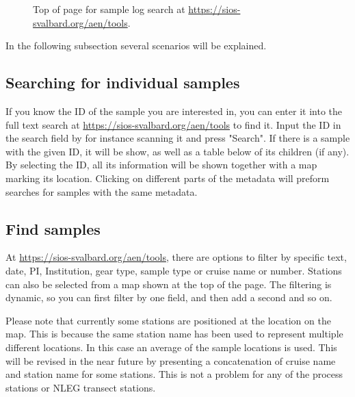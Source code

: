 \documentclass[a4paper,english, 11pt]{article}
\begin{document}
\begin{figure}[htb]
    \centering
    \caption{\label{fig:sios}
        Top of page for sample log search at \url{https://sios-svalbard.org/aen/tools}.
    }
\end{figure}
In the following subsection several scenarios will be explained. 

\subsection{Searching for individual samples} %
\label{sub:search_ind}

If you know the ID of the sample you are interested in, you can enter it into the full text search at \url{https://sios-svalbard.org/aen/tools} to find it. Input the ID in the search field by for instance scanning it and press "Search". If there is a sample with the given ID, it will be show, as well as a table below of its children (if any). By selecting the ID,  all its information will be shown together with a map marking its location. Clicking on different parts of the metadata will preform searches for samples with the same metadata. 


\subsection{Find samples} %
\label{sub:find_samples}

At \url{https://sios-svalbard.org/aen/tools}, there are options to filter by specific text, date, PI, Institution, gear type, sample type or cruise name or number. Stations can also be selected from a map shown at the top of the page. The filtering is dynamic, so you can first filter by one field, and then add a second and so on.

Please note that currently some stations are positioned at the location on the map. This is because the same station name has been used to represent multiple different locations. In this case an average of the sample locations is used. This will be revised in the near future by presenting a concatenation of cruise name and station name for some stations. This is not a problem for any of the process stations or NLEG transect stations.
\end{document}
